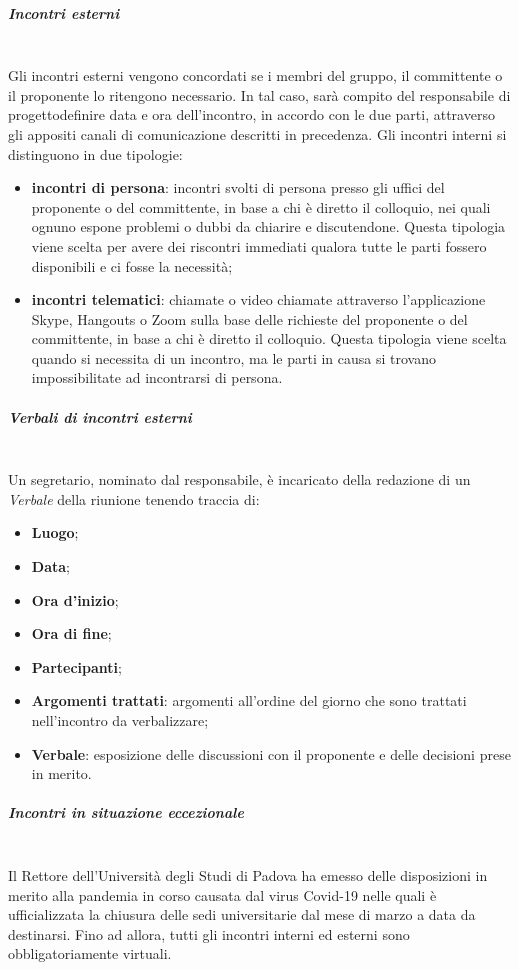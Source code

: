 			\subparagraph{Incontri esterni}\mbox{}\\ [1mm]
				Gli incontri esterni vengono concordati se i membri del gruppo, il committente o il proponente lo ritengono necessario. In tal caso, sarà compito del responsabile di progetto\glosp definire data e ora dell'incontro, in accordo con le due parti, attraverso gli appositi canali di comunicazione descritti in precedenza.
				Gli incontri interni si distinguono in due tipologie:
				\begin{itemize}
					\item \textbf{incontri di persona}: incontri svolti di persona presso gli uffici del proponente o del committente, in base a chi è diretto il colloquio, nei quali ognuno espone problemi o dubbi da chiarire e discutendone. Questa tipologia viene scelta per avere dei riscontri immediati qualora tutte le parti fossero disponibili e ci fosse la necessità;
					\item \textbf{incontri telematici}: chiamate o video chiamate attraverso l'applicazione Skype, Hangouts o Zoom sulla base delle richieste del proponente o del committente, in base a chi è diretto il colloquio. Questa tipologia viene scelta quando si necessita di un incontro, ma le parti in causa si trovano impossibilitate ad incontrarsi di persona. 
				\end{itemize}
			\subparagraph{Verbali di incontri esterni}\mbox{}\\ [1mm]
				Un segretario, nominato dal responsabile, è incaricato della redazione di un \textit{Verbale} della riunione tenendo traccia di:
				\begin{itemize}
					\item \textbf{Luogo};
					\item \textbf{Data};
					\item \textbf{Ora d'inizio};
					\item \textbf{Ora di fine};
					\item \textbf{Partecipanti};
					\item \textbf{Argomenti trattati}: argomenti all'ordine del giorno che sono trattati nell'incontro da verbalizzare;
					\item \textbf{Verbale}: esposizione delle discussioni con il proponente e delle decisioni prese in merito.
				\end{itemize}
			\subparagraph{Incontri in situazione eccezionale}\mbox{}\\ [1mm]
			Il Rettore dell'Università degli Studi di Padova ha emesso delle disposizioni in merito alla pandemia in corso causata dal virus Covid-19 nelle quali è ufficializzata la chiusura delle sedi universitarie dal mese di marzo a data da destinarsi. Fino ad allora, tutti gli incontri interni ed esterni sono obbligatoriamente virtuali.
